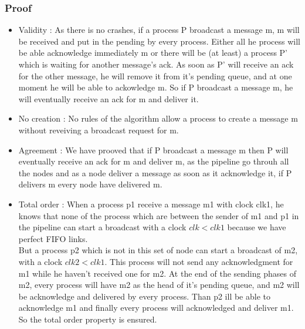 \documentclass[a4paper]{article}
\begin{document}
        \subsubsection{Proof}
        \begin{itemize}
            \item Validity : As there  is no crashes, if a process P broadcast a
                message m, m will be received and put in the pending by every
                process. Either all he process will be able acknowledge immediately m 
                or there will be (at least) a process P' which is waiting for another message's ack.
                As soon as P' will receive an ack for the other message, he will remove it from it's
                pending queue, and at one moment he will be able to ackowledge m. 
                So if P broadcast a message m, he will eventually receive an ack
                for m and deliver it.
            \item No creation : No rules of the algorithm allow a process to
                create a message m without reveiving a broadcast request for m.
            \item Agreement : We have prooved that if P broadcast a message m
                then P will eventually receive an ack for m and deliver m, as
                the pipeline go throuh all the nodes and as a node deliver a
                message as soon as it acknowledge it, if P delivers m every node
                have delivered m.
            \item Total order : When a process p1 receive a message m1 with
                clock clk1, he knows
                that none of the process which are between the sender of m1 and p1
                in the pipeline can start a broadcast with a clock $clk<clk1$
                because we have perfect FIFO links.\\
                But a process p2 which is not in this set of node can start a
                broadcast of m2, with a clock $clk2<clk1$. This process will not send
                any acknowledgment for m1 while he haven't received one for m2.
                At the end of the sending phases of m2, every process will have
                m2 as the head of it's pending queue, and m2 will be acknowledge
                and delivered by every process. Than p2 ill be able to
                acknowledge m1 and finally every process will acknowledged and
                deliver m1. So the total order property is ensured.
        \end{itemize}
        \label{sec:pipelineack-proof}
\end{document}
